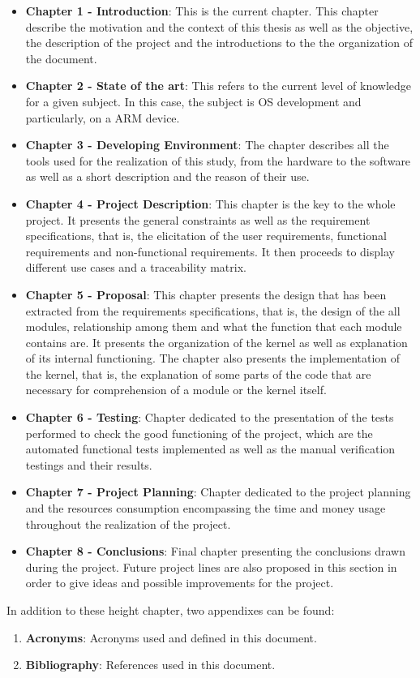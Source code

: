 \begin{itemize}
\item \textbf{Chapter 1 - Introduction}: This is the current chapter. This chapter describe the motivation and the context of this thesis as well as the objective, the description of the project and the introductions to the the organization of the document.
\item \textbf{Chapter 2 - State of the art}: This refers to the current level of knowledge for a given subject. In this case, the subject is OS development and particularly, on a ARM device.
\item \textbf{Chapter 3 - Developing Environment}: The chapter describes all the tools used for the realization of this study, from the hardware to the software as well as a short description and the reason of their use.
\item \textbf{Chapter 4 - Project Description}: This chapter is the key to the whole project. It presents the general constraints as well as the requirement specifications, that is, the elicitation of the user requirements, functional requirements and non-functional requirements. It then proceeds to display different use cases and a traceability matrix.
\item \textbf{Chapter 5 - Proposal}: This chapter presents the design that has been extracted from the requirements specifications, that is, the design of the all modules, relationship among them and what the function that each module contains are. It presents the organization of the kernel as well as explanation of its internal functioning. The chapter also presents the implementation of the kernel, that is, the explanation of some parts of the code that are necessary for comprehension of a module or the kernel itself.
\item \textbf{Chapter 6 - Testing}: Chapter dedicated to the presentation of the tests performed to check the good functioning of the project, which are the automated functional tests implemented as well as the manual verification testings and their results.
\item \textbf{Chapter 7 - Project Planning}: Chapter dedicated to the project planning and the resources consumption encompassing the time and money usage throughout the realization of the project.
\item \textbf{Chapter 8 - Conclusions}: Final chapter presenting the conclusions drawn during the project. Future project lines are also proposed in this section in order to give ideas and possible improvements for the project.
\end{itemize}

In addition to these height chapter, two appendixes can be found:
\begin{enumerate}
	\item \textbf{Acronyms}: Acronyms used and defined in this document.
	\item \textbf{Bibliography}: References used in this document.
\end{enumerate}
